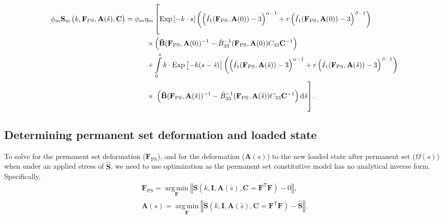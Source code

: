 \begin{equation} \label{eq:fullmatrix}
\begin{split}
\phi_m \mathbf{S}_\mathrm{m}\left(k , \mathbf{F}_\mathrm{PS}, \mathbf{A}(\hat{s}), \mathbf{C}\right) = \phi_m \eta_m& \left[ \vphantom{\int\displaylimits_0^s} \mathrm{Exp}\left[-k  \cdot s\right]  \left(\left( \bar{I_1} (\mathbf{F}_\mathrm{PS}, \mathbf{A}(0)) - 3\right)^{\alpha - 1} + r \left( \bar{I_1} (\mathbf{F}_\mathrm{PS}, \mathbf{A}(0)) - 3\right)^{\beta - 1}\right)  \right.\\
\times& \left( \mathbf{\tilde{B}}(\mathbf{F}_\mathrm{PS}, \mathbf{A}(0))^{-1} - \tilde{B}_{33}^{-1}(\mathbf{F}_\mathrm{PS}, \mathbf{A}(0))C_{33}\mathbf{C}^{-1}\right) \\
+& \int\displaylimits_0^s k \cdot \mathrm{Exp}\left[-k (s - \hat{s})\right] \left(\left( \bar{I_1} (\mathbf{F}_\mathrm{PS}, \mathbf{A}(\hat{s})) - 3\right)^{\alpha - 1} + r \left( \bar{I_1} (\mathbf{F}_\mathrm{PS}, \mathbf{A}(\hat{s})) - 3\right)^{\beta - 1}\right) \\
\times& \left. \vphantom{\int\displaylimits_-^s} \left( \mathbf{\tilde{B}}(\mathbf{F}_\mathrm{PS}, \mathbf{A}(\hat{s}))^{-1} - \tilde{B}_{33}^{-1}(\mathbf{F}_\mathrm{PS}, \mathbf{A}(\hat{s}))C_{33}\mathbf{C}^{-1}\right) \mathrm{d}\hat{s}\right].
\end{split}
\end{equation}


\subsection{Determining permanent set deformation and loaded state}
To solve for the permanent set deformation ($\mathbf{F}_\mathrm{PS}$), and for the deformation ($\mathbf{A}(s)$) to the new loaded state after permanent set ($\Omega(s)$) when under an applied stress of $\mathbf{\hat{S}}$, we need to use optimization as the permanent set constitutive model has no analytical inverse form. Specifically,
\begin{equation}\label{eq:optimization}
\begin{gathered}
\mathbf{F}_\mathrm{PS} = \operatorname*{arg\,min}_\mathbf{F} \left\Vert \mathbf{S}\left(k , \mathbf{I}, \mathbf{A}(\hat{s}), \mathbf{C}=\mathbf{F}^\mathsf{T}\mathbf{F}\right) - 0 \right\Vert, \\
\mathbf{A}(s) = \operatorname*{arg\,min}_\mathbf{F} \left\Vert \mathbf{S}\left(k , \mathbf{I}, \mathbf{A}(\hat{s}), \mathbf{C}=\mathbf{F}^\mathsf{T}\mathbf{F}\right) - \mathbf{\hat{S}} \right\Vert.
\end{gathered}
\end{equation}

